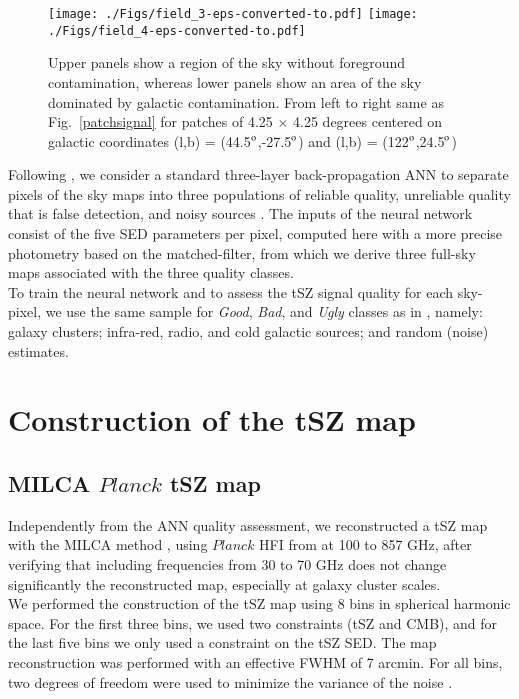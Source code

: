 \documentclass[traditabstract,a4,twocolumn]{aa}
\begin{document}
\begin{figure*}[!th]
\center
\texttt{[image: ./Figs/field\_3-eps-converted-to.pdf]}
\texttt{[image: ./Figs/field\_4-eps-converted-to.pdf]}
\caption{ Upper panels show a region of the sky without foreground contamination, whereas lower panels show an area of the sky dominated by galactic contamination. From left to right same
 as Fig.~\ref{patchsignal} for patches of 4.25 $\times$ 4.25 degrees centered on galactic coordinates (l,b) = (44.5$^{\rm o}$,-27.5$^{\rm o}$) and (l,b) = (122$^{\rm o}$,24.5$^{\rm o}$)}
\label{patchsignal2}
\end{figure*}
Following \citet{agh14}, we consider a standard three-layer back-propagation ANN to separate
pixels of the sky maps into three populations of reliable quality, unreliable quality that is false detection, and noisy sources \citep[they are referred to as good bad and ugly in][]{agh14}. The inputs of the neural network consist of
the five SED parameters per pixel, computed here with a  more precise photometry based on the matched-filter, from which we derive three full-sky maps associated with the three quality classes.\\ 


To train the neural network and to assess the tSZ signal quality for each sky-pixel, we use the same sample for {\it Good}, {\it Bad}, and {\it Ugly} classes as in \citet{agh14}, namely: galaxy clusters; infra-red, radio, and cold galactic sources; and random (noise) estimates.


\section{Construction of the tSZ map}
\subsection{MILCA $Planck$ tSZ map}

Independently from the ANN quality assessment, we reconstructed a tSZ map with the MILCA method
\citep{hur13}, using $Planck$ HFI from at 100 to 857 GHz, after verifying
that including frequencies from 30 to 70 GHz does not change significantly the reconstructed map, especially at galaxy cluster
scales.\\ We performed the construction of the tSZ map using 8 bins
in spherical harmonic space. For the first three bins, we used two constraints (tSZ and CMB), and for the last five bins we only used a constraint on the tSZ SED. The map reconstruction was performed with an effective FWHM of 7 arcmin. For all bins, two degrees of freedom were used to minimize the variance of the noise \citep[see][for a detailed description of the MILCA method]{hur13}.\\ 
\end{document}
